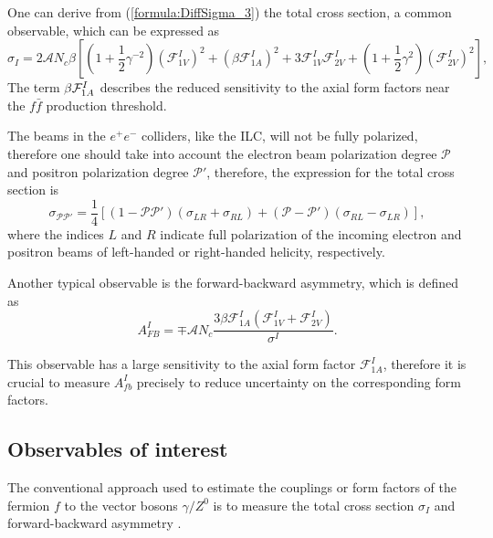 One can derive from (\ref{formula:DiffSigma_3}) the total cross section, a common observable, which can be expressed as
\begin{equation}
\label{formula:TotalSigma_3}
\sigma_I = 2\mathcal{A}N_c\beta[(1+\frac{1}{2}\gamma^{-2})(\mathcal{F}^I_{1V})^2 + (\beta\mathcal{F}^I_{1A})^2+3\mathcal{F}^I_{1V}\mathcal{F}^I_{2V}+(1+\frac{1}{2}\gamma^{2})(\mathcal{F}^I_{2V})^2],
\end{equation}
The term $\beta \mathcal{F}^I_{1A}$ describes the reduced sensitivity to the axial form factors near the $f\bar{f}$ production threshold. 

The beams in the $e^+e^-$ colliders, like the ILC, will not be fully polarized, therefore one should take into account the electron beam polarization degree $\mathcal{P}$ and positron polarization degree $\mathcal{P}'$, therefore, the expression for the total cross section is
\begin{equation}
\sigma_{\mathcal{P}\mathcal{P}'} = \frac{1}{4}[(1-\mathcal{P}\mathcal{P}')(\sigma_{LR}+\sigma_{RL} ) + (\mathcal{P} - \mathcal{P}')(\sigma_{RL} - \sigma_{LR})],
\end{equation}
where the indices $L$ and $R$ indicate full polarization of the incoming electron and positron beams of left-handed or right-handed helicity, respectively.

Another typical observable is the forward-backward asymmetry, which is defined as
\begin{equation}
A_{FB}^I = \mp \mathcal{A} N_c \frac{3\beta\mathcal{F}^I_{1A}(\mathcal{F}^I_{1V} + \mathcal{F}^I_{2V})}{\sigma^I}.
\label{formula:AfbForm_3}
\end{equation}

This observable has a large sensitivity to the axial form factor $\mathcal{F}^I_{1A}$, therefore it is crucial to measure $A_{fb}^I$ precisely to reduce uncertainty on the corresponding form factors.
\subsection{Observables of interest}
The conventional approach used to estimate the couplings or form factors of the fermion $f$ to the vector bosons $\gamma /Z^0$ is to measure the total cross section $\sigma_I$ and forward-backward asymmetry \afb.

